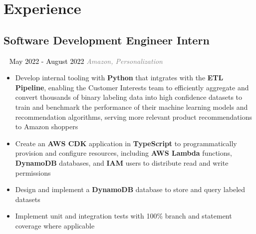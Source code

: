 \documentclass{article}
\newcommand{\resumesection}[3]{
    \subsection*{#1}
    \ 
    \normalsize
    \normalsize
    \hfill
    \textcolor{black}{#3}
    \normalsize
    \newline
    \small
    \textcolor{grey}{\emph{#2}}
}
\begin{document}
\section*{Experience}
\resumesection{Software Development Engineer Intern}{Amazon, Personalization}{May 2022 - August 2022}
\begin{itemize}
	\item Develop internal tooling with \textbf{Python} that intgrates with the \textbf{ETL Pipeline}, enabling the Customer Interests team to efficiently aggregate and convert thousands of binary labeling data into high confidence datasets to train and benchmark the performance of their machine learning models and recommendation algorithms, serving more relevant product recommendations to Amazon shoppers
	\item Create an \textbf{AWS CDK} application in \textbf{TypeScript} to programmatically provision and configure resources, including \textbf{AWS Lambda} functions, \textbf{DynamoDB} databases, and \textbf{IAM} users to distribute read and write permissions
	\item Design and implement a \textbf{DynamoDB} database to store and query labeled datasets
	\item Implement unit and integration tests with 100\% branch and statement coverage where applicable
\end{itemize}
\end{document}
